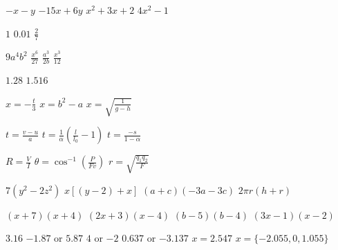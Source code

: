 \begin{Answer}[ref={ex11}]
\Question %
\begin{tasks}
	\task 	 $-x -y $ 
	\task    $-15x+6y $
	\task 	 $x^{2} +3 x +2$
	\task    $4 x^{2} -1$
\end{tasks}
 	
\Question %
\begin{tasks}
	\task 	 $1$
	\task    $0.01$
	\task $\frac{2}{7}$
\end{tasks}

\Question %
\begin{tasks}
	\task 	 $9 a^{4} b^{2}$
	\task    $\frac{x^{6}}{27}$
	\task 	$\frac{a^3}{2b}$
	\task	$\frac{x^3}{12}$
\end{tasks}

\Question %
\begin{tasks}
	\task 	 $1.28$
	\task    $1.516$
\end{tasks}

\Question %
\begin{tasks}
	\task $x=-\frac{t}{3}$
	\task $x=b^2-a$
	\task $x=\sqrt{\frac{1}{g-h}}$
\end{tasks}

\Question %
\begin{tasks}
	\task 	$t =\frac{v -u}{a}$ 
	\task   $t =\frac{1}{\alpha } \left (\frac{l}{l_{0}} -1\right )$
	\task 	$t=\frac{-s}{1-\alpha}$
\end{tasks}

\Question %
\begin{tasks}
	\task 	 $R=\frac{V}{I}$ 
	\task 	 $\theta=\cos^{-1}\left(\frac{P}{Fv}\right)$ 
	\task 	 $r=\sqrt{\frac{q_1 q_2}{F}}$ 
\end{tasks}

\Question %
\begin{tasks}
	\task 	$7(y^2-2z^2)$ 
	\task  $x[(y-2)+x]$
	\task $(a+c)(-3a-3c)$
	\task $2\pi r(h+r)$
\end{tasks}

\Question %
\begin{tasks}
	\task 	 $\left (x +7\right ) \left (x +4\right )$
	\task    $\left (2 x +3\right ) \left (x -4\right )$
	\task	$(b-5)(b-4)$
	\task	$(3x-1)(x-2)$
\end{tasks}

\Question %
\begin{tasks}
	\task 	$3.16$
	\task   $ -1.87$ or $5.87$
	\task 	$4$ or $ -2$
	\task   $0.637$ or $ -3.137$ 
	\task 	$x=2.547$
	\task 	$x=\{-2.055,0,1.055\}$
\end{tasks}
\end{Answer}
